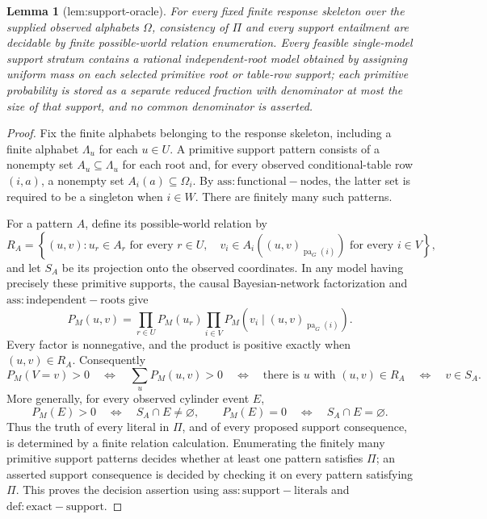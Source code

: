 \documentclass{article}
\newtheorem{lemma}{Lemma}
\begin{document}
\begin{lemma}[lem:support-oracle]\label{lem:support-oracle}
For every fixed finite response skeleton over the supplied observed alphabets \(\Omega\), consistency of \(\Pi\) and every support entailment are decidable by finite possible-world relation enumeration. Every feasible single-model support stratum contains a rational independent-root model obtained by assigning uniform mass on each selected primitive root or table-row support; each primitive probability is stored as a separate reduced fraction with denominator at most the size of that support, and no common denominator is asserted.
\end{lemma}
\begin{proof}
Fix the finite alphabets belonging to the response skeleton, including a finite alphabet \(\Lambda_u\) for each \(u\in U\).  A primitive support pattern consists of a nonempty set \(A_u\subseteq\Lambda_u\) for each root and, for every observed conditional-table row \((i,a)\), a nonempty set \(A_i(a)\subseteq\Omega_i\).  By \(\mathrm{ass:functional-nodes}\), the latter set is required to be a singleton when \(i\in W\).  There are finitely many such patterns.

For a pattern \(A\), define its possible-world relation by
\[
 R_A=\left\{(u,v):u_r\in A_r\text{ for every }r\in U,
 \quad v_i\in A_i\!\left((u,v)_{\operatorname{pa}_G(i)}\right)
 \text{ for every }i\in V\right\},
\]
and let \(S_A\) be its projection onto the observed coordinates.  In any model having precisely these primitive supports, the causal Bayesian-network factorization and \(\mathrm{ass:independent-roots}\) give
\[
 P_M(u,v)=\prod_{r\in U}P_M(u_r)
             \prod_{i\in V}P_M\!\left(v_i\mid
             (u,v)_{\operatorname{pa}_G(i)}\right).
\]
Every factor is nonnegative, and the product is positive exactly when \((u,v)\in R_A\).  Consequently
\[
 P_M(V=v)>0
 \quad\Longleftrightarrow\quad
 \sum_{u}P_M(u,v)>0
 \quad\Longleftrightarrow\quad
 \text{there is }u\text{ with }(u,v)\in R_A
 \quad\Longleftrightarrow\quad v\in S_A.
\]
More generally, for every observed cylinder event \(E\),
\[
 P_M(E)>0\quad\Longleftrightarrow\quad S_A\cap E\ne\varnothing,
 \qquad
 P_M(E)=0\quad\Longleftrightarrow\quad S_A\cap E=\varnothing.
\]
Thus the truth of every literal in \(\Pi\), and of every proposed support consequence, is determined by a finite relation calculation.  Enumerating the finitely many primitive support patterns decides whether at least one pattern satisfies \(\Pi\); an asserted support consequence is decided by checking it on every pattern satisfying \(\Pi\).  This proves the decision assertion using \(\mathrm{ass:support-literals}\) and \(\mathrm{def:exact-support}\).


\end{proof}
\end{document}
